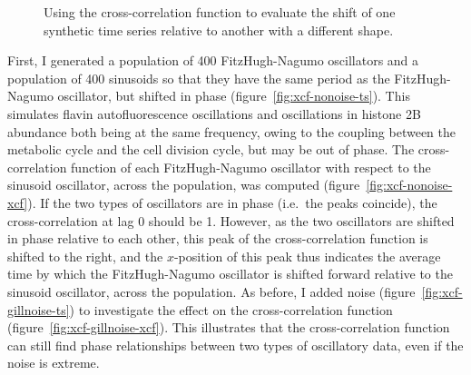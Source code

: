 \begin{figure}
  \caption{
    Using the cross-correlation function to evaluate the shift of one synthetic time series relative to another with a different shape.
  }
  \label{fig:xcf}
\end{figure}

First, I generated a population of 400 FitzHugh-Nagumo oscillators and a population of 400 sinusoids so that they have the same period as the FitzHugh-Nagumo oscillator, but shifted in phase (figure~\ref{fig:xcf-nonoise-ts}).
This simulates flavin autofluorescence oscillations and oscillations in histone 2B abundance both being at the same frequency, owing to the coupling between the metabolic cycle and the cell division cycle, but may be out of phase.
The cross-correlation function of each FitzHugh-Nagumo oscillator with respect to the sinusoid oscillator, across the population, was computed (figure~\ref{fig:xcf-nonoise-xcf}).
If the two types of oscillators are in phase (i.e.\ the peaks coincide), the cross-correlation at lag 0 should be 1.
However, as the two oscillators are shifted in phase relative to each other, this peak of the cross-correlation function is shifted to the right, and the $x$-position of this peak thus indicates the average time by which the FitzHugh-Nagumo oscillator is shifted forward relative to the sinusoid oscillator, across the population.
As before, I added noise (figure~\ref{fig:xcf-gillnoise-ts}) to investigate the effect on the cross-correlation function (figure~\ref{fig:xcf-gillnoise-xcf}).
This illustrates that the cross-correlation function can still find phase relationships between two types of oscillatory data, even if the noise is extreme.

